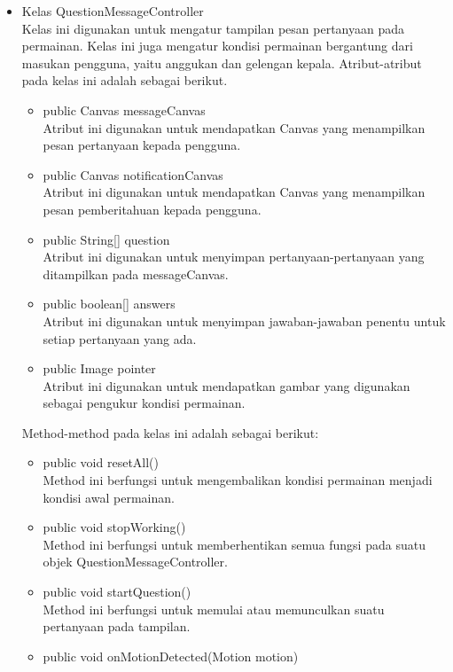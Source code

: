 \begin{itemize}
\begin{itemize}
\begin{itemize}
        \end{itemize}
        \item Kelas QuestionMessageController\\
        Kelas ini digunakan untuk mengatur tampilan pesan pertanyaan pada permainan. Kelas ini juga mengatur kondisi permainan bergantung dari masukan pengguna, yaitu anggukan dan gelengan kepala.
        Atribut-atribut pada kelas ini adalah sebagai berikut.
        \begin{itemize}
            \item public Canvas messageCanvas\\
            Atribut ini digunakan untuk mendapatkan Canvas yang menampilkan pesan pertanyaan kepada pengguna.
            \item public Canvas notificationCanvas\\
            Atribut ini digunakan untuk mendapatkan Canvas yang menampilkan pesan pemberitahuan kepada pengguna.
            \item public String[] question\\
            Atribut ini digunakan untuk menyimpan pertanyaan-pertanyaan yang ditampilkan pada messageCanvas.
            \item public boolean[] answers\\
            Atribut ini digunakan untuk menyimpan jawaban-jawaban penentu untuk setiap pertanyaan yang ada.
            \item public Image pointer\\
            Atribut ini digunakan untuk mendapatkan gambar yang digunakan sebagai pengukur kondisi permainan.
        \end{itemize}
        Method-method pada kelas ini adalah sebagai berikut:
        \begin{itemize}
            \item public void resetAll()\\
            Method ini berfungsi untuk mengembalikan kondisi permainan menjadi kondisi awal permainan.
            \item public void stopWorking()\\
            Method ini berfungsi untuk memberhentikan semua fungsi pada suatu objek QuestionMessageController.
            \item public void startQuestion()\\
            Method ini berfungsi untuk memulai atau memunculkan suatu pertanyaan pada tampilan.
            \item public void onMotionDetected(Motion motion)\\

\end{itemize}
\end{itemize}
\end{itemize}
